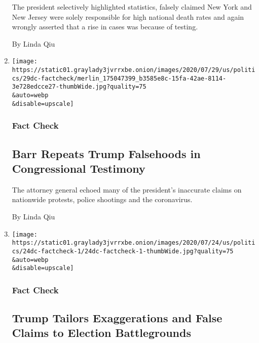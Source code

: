 \begin{enumerate}
  The president selectively highlighted statistics, falsely claimed New
  York and New Jersey were solely responsible for high national death
  rates and again wrongly asserted that a rise in cases was because of
  testing.

  By Linda Qiu
\item
  \href{/2020/07/29/us/politics/barr-trump-factcheck-congressional-testimony.html}{}

  \texttt{[image: https://static01.graylady3jvrrxbe.onion/images/2020/07/29/us/politics/29dc-factcheck/merlin\_175047399\_b3585e8c-15fa-42ae-8114-3e728edcce27-thumbWide.jpg?quality=75\\\&auto=webp\\\&disable=upscale]}

  \hypertarget{fact-check-4}{%
  \subsubsection{Fact Check}\label{fact-check-4}}

  \hypertarget{barr-repeats-trump-falsehoods-in-congressional-testimony}{%
  \subsection{Barr Repeats Trump Falsehoods in Congressional
  Testimony}\label{barr-repeats-trump-falsehoods-in-congressional-testimony}}

  The attorney general echoed many of the president's inaccurate claims
  on nationwide protests, police shootings and the coronavirus.

  By Linda Qiu
\item
  \href{/2020/07/24/us/politics/trump-election-battlegrounds-fact-check.html}{}

  \texttt{[image: https://static01.graylady3jvrrxbe.onion/images/2020/07/24/us/politics/24dc-factcheck-1/24dc-factcheck-1-thumbWide.jpg?quality=75\\\&auto=webp\\\&disable=upscale]}

  \hypertarget{fact-check-5}{%
  \subsubsection{Fact Check}\label{fact-check-5}}

  \hypertarget{trump-tailors-exaggerations-and-false-claims-to-election-battlegrounds}{%
  \subsection{Trump Tailors Exaggerations and False Claims to Election
  Battlegrounds}\label{trump-tailors-exaggerations-and-false-claims-to-election-battlegrounds}}


\end{enumerate}
